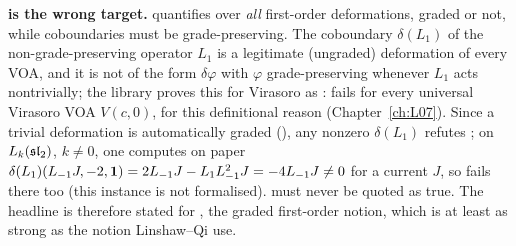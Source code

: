 \begin{warning}
\textbf{ is the wrong target.}  quantifies over \emph{all}
first-order deformations, graded or not, while coboundaries must be grade-preserving. The
coboundary $\delta(L_1)$ of the non-grade-preserving operator $L_1$ is a legitimate (ungraded)
deformation of every VOA, and it is not of the form $\delta\varphi$ with $\varphi$ grade-preserving
whenever $L_1$ acts nontrivially; the library proves this for Virasoro as
:  fails for every universal Virasoro
VOA $V(c,0)$, for this definitional reason (Chapter~\ref{ch:L07}). Since a trivial deformation is
automatically graded (), any nonzero $\delta(L_1)$ refutes
; on $L_k(\mathfrak{sl}_2)$, $k\neq0$, one computes on paper
$\delta(L_1)(L_{-1}J,-2,\mathbf{1}) = 2L_{-1}J - L_1L_{-1}^2J = -4L_{-1}J\neq0$ for a current $J$, so
 fails there too (this instance is not formalised).  must never be quoted as
true. The headline is therefore stated for , the graded first-order notion, which is at
least as strong as the notion Linshaw--Qi use.
\end{warning}

